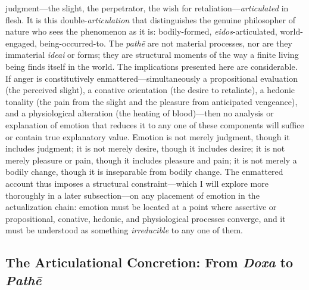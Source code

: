 \documentclass{article}
\begin{document}
judgment---the slight, the perpetrator, the wish for retaliation---\textit{articulated} in flesh. It is this double-\textit{articulation} that distinguishes the genuine philosopher of nature who sees the phenomenon as it is: bodily-formed, \textit{eidos}-articulated, world-engaged, being-occurred-to. The \textit{pathē} are not material processes, nor are they immaterial \textit{ideai} or forms; they are structural moments of the way a finite living being finds itself in the world. The implications presented here are considerable. If anger is constitutively enmattered---simultaneously a propositional evaluation (the perceived slight), a conative orientation (the desire to retaliate), a hedonic tonality (the pain from the slight and the pleasure from anticipated vengeance), and a physiological alteration (the heating of blood)---then no analysis or explanation of emotion that reduces it to any one of these components will suffice or contain true explanatory value. Emotion is not merely judgment, though it includes judgment; it is not merely desire, though it includes desire; it is not merely pleasure or pain, though it includes pleasure and pain; it is not merely a bodily change, though it is inseparable from bodily change. The enmattered account thus imposes a structural constraint---which I will explore more thoroughly in a later subsection---on any placement of emotion in the actualization chain: emotion must be located at a point where assertive or propositional, conative, hedonic, and physiological processes converge, and it must be understood as something \textit{irreducible} to any one of them.

\subsection{The Articulational Concretion: From \textit{Doxa} to \textit{Pathē}}
\end{document}
